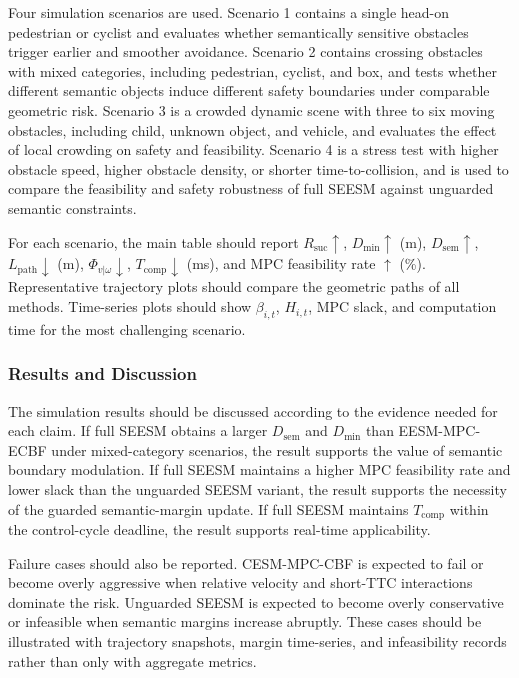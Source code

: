 \documentclass[journal]{IEEEtranTIE}
\begin{document}
    Four simulation scenarios are used. Scenario 1 contains a single head-on
    pedestrian or cyclist and evaluates whether semantically sensitive obstacles
    trigger earlier and smoother avoidance. Scenario 2 contains crossing
    obstacles with mixed categories, including pedestrian, cyclist, and box, and
    tests whether different semantic objects induce different safety boundaries
    under comparable geometric risk. Scenario 3 is a crowded dynamic scene with
    three to six moving obstacles, including child, unknown object, and vehicle,
    and evaluates the effect of local crowding on safety and feasibility.
    Scenario 4 is a stress test with higher obstacle speed, higher obstacle
    density, or shorter time-to-collision, and is used to compare the feasibility
    and safety robustness of full SEESM against unguarded semantic constraints.

    For each scenario, the main table should report
    $R_{\mathrm{suc}}\uparrow$, $D_{\min}\uparrow$ (m),
    $D_{\mathrm{sem}}\uparrow$, $L_{\mathrm{path}}\downarrow$ (m),
    $\Phi_{v|\omega}\downarrow$, $T_{\mathrm{comp}}\downarrow$ (ms), and MPC
    feasibility rate $\uparrow$ (\%). Representative trajectory plots should
    compare the geometric paths of all methods. Time-series plots should show
    $\beta_{i,t}$, $H_{i,t}$, MPC slack, and computation time for the most
    challenging scenario.

    \subsubsection{Results and Discussion}
    The simulation results should be discussed according to the evidence needed
    for each claim. If full SEESM obtains a larger $D_{\mathrm{sem}}$ and
    $D_{\min}$ than EESM-MPC-ECBF under mixed-category scenarios, the result
    supports the value of semantic boundary modulation. If full SEESM maintains a
    higher MPC feasibility rate and lower slack than the unguarded SEESM variant,
    the result supports the necessity of the guarded semantic-margin update. If
    full SEESM maintains $T_{\mathrm{comp}}$ within the control-cycle deadline,
    the result supports real-time applicability.

    Failure cases should also be reported. CESM-MPC-CBF is expected to fail or
    become overly aggressive when relative velocity and short-TTC interactions
    dominate the risk. Unguarded SEESM is expected to become overly conservative
    or infeasible when semantic margins increase abruptly. These cases should be
    illustrated with trajectory snapshots, margin time-series, and infeasibility
    records rather than only with aggregate metrics.
\end{document}
